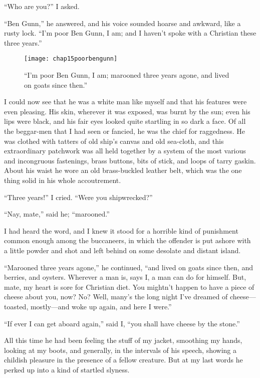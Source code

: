 \enquote{Who are you?} I asked.

\enquote{Ben Gunn,} he answered, and his voice sounded hoarse and awkward, like a rusty lock. \enquote{I’m poor Ben Gunn, I am; and I haven’t spoke with a Christian these three years.}

  \begin{figure}[p]
\centering
\texttt{[image: chap15poorbengunn]}
\caption[\enquote{I’m poor Ben Gunn, I am}]{\enquote{I’m poor Ben Gunn, I am; marooned three years agone, and lived on goats since then.}}
\end{figure}

I could now see that he was a white man like myself and that his features were even pleasing. His skin, wherever it was exposed, was burnt by the sun; even his lips were black, and his fair eyes looked quite startling in so dark a face. Of all the beggar-men that I had seen or fancied, he was the chief for raggedness. He was clothed with tatters of old ship’s canvas and old sea-cloth, and this extraordinary patchwork was all held together by a system of the most various and incongruous fastenings, brass buttons, bits of stick, and loops of tarry gaskin. About his waist he wore an old brass-buckled leather belt, which was the one thing solid in his whole accoutrement.

\enquote{Three years!} I cried. \enquote{Were you shipwrecked?}

\enquote{Nay, mate,} said he; \enquote{marooned.}

I had heard the word, and I knew it stood for a horrible kind of punishment common enough among the buccaneers, in which the offender is put ashore with a little powder and shot and left behind on some desolate and distant island.

\enquote{Marooned three years agone,} he continued, \enquote{and lived on goats since then, and berries, and oysters. Wherever a man is, says I, a man can do for himself. But, mate, my heart is sore for Christian diet. You mightn’t happen to have a piece of cheese about you, now? No? Well, many’s the long night I’ve dreamed of cheese---toasted, mostly---and woke up again, and here I were.}

\enquote{If ever I can get aboard again,} said I, \enquote{you shall have cheese by the stone.}

All this time he had been feeling the stuff of my jacket, smoothing my hands, looking at my boots, and generally, in the intervals of his speech, showing a childish pleasure in the presence of a fellow creature. But at my last words he perked up into a kind of startled slyness.

